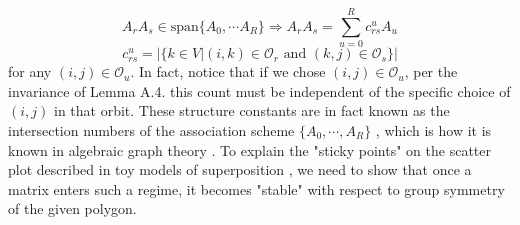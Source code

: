 \documentclass{article}
\theoremstyle{plain}
\numberwithin{equation}{section}
\theoremstyle{definition}
\theoremstyle{remark}
\begin{document}
\begin{equation} A_rA_s\in \text{span}\{A_0,\cdots A_R\} \Rightarrow A_rA_s = \sum_{u=0}^R c_{rs}^uA_u\end{equation}
\begin{equation}c_{rs}^u = |\{k\in V| (i, k)\in \mathcal{O}_r \text{ and }(k, j)\in \mathcal{O}_s\}|\end{equation}
for any $(i, j)\in \mathcal{O}_u$. In fact, notice that if we chose $(i, j)\in \mathcal{O}_u$, per the invariance of Lemma A.4. this count must be independent of the specific choice of $(i, j)$ in that orbit. These structure constants are in fact known as the intersection numbers of the association scheme $\{A_0, \cdots, A_R\}$ \cite{rabailey}, which is how it is known in algebraic graph theory \cite{godsil-royle}. 
To explain the "sticky points" on the scatter plot described in toy models of superposition \cite{toymodels}, we need to show that once a matrix enters such a regime, it becomes "stable" with respect to group symmetry of the given polygon. 
\end{document}
